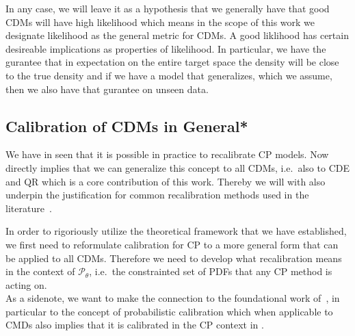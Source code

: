 In any case, we will leave it as a hypothesis that we generally have that good CDMs will have high likelihood which means in the scope of this work we designate likelihood as the general metric for CDMs. A good liklihood has certain desireable implications as properties of likelihood. In particular, we have the gurantee that in expectation on the entire target space the density will be close to the true density and if we have a model that generalizes, which we assume, then we also have that gurantee on unseen data.%

\subsection{Calibration of CDMs in General*}\label{sec:calibration_cde_general}

We have in  seen that it is possible in practice to recalibrate CP models. Now  directly implies that we can generalize this concept to all CDMs, i.e.\ also to CDE and QR which is a core contribution of this work. Thereby we will with  also underpin the justification for common recalibration methods used in the literature~\cite{sesia2021conformal}.

In order to rigoriously utilize the theoretical framework that we have established, we first need to reformulate calibration for CP to a more general form that can be applied to all CDMs. Therefore we need to develop what recalibration means in the context of $\mathscr{P}_{\theta}$, i.e.\ the constrainted set of PDFs that any CP method is acting on.\\
As a sidenote, we want to make the connection to the foundational work of~\cite{gneiting2007probabilistic}, in particular to the concept of probabilistic calibration which when applicable to CMDs also implies that it is calibrated in the CP context in .

